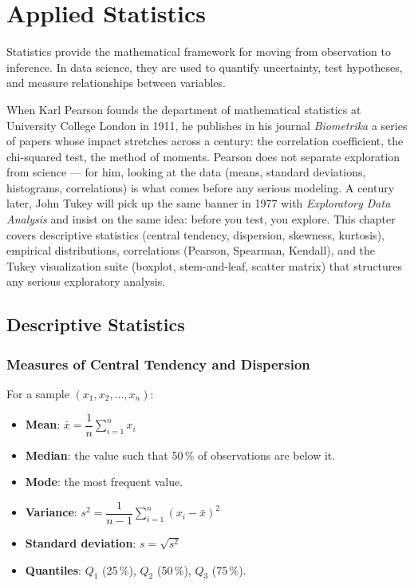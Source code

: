 \chapter{Applied Statistics}
\label{ch:statistiques}

\begin{intuition}
Statistics provide the mathematical framework for moving from observation to inference. In data science, they are used to quantify uncertainty, test hypotheses, and measure relationships between variables.
\end{intuition}

When Karl Pearson founds the department of mathematical statistics at University College London in 1911, he publishes in his journal \emph{Biometrika} a series of papers whose impact stretches across a century: the correlation coefficient, the chi-squared test, the method of moments. Pearson does not separate exploration from science --- for him, looking at the data (means, standard deviations, histograms, correlations) is what comes before any serious modeling. A century later, John Tukey will pick up the same banner in 1977 with \emph{Exploratory Data Analysis} and insist on the same idea: before you test, you explore. This chapter covers descriptive statistics (central tendency, dispersion, skewness, kurtosis), empirical distributions, correlations (Pearson, Spearman, Kendall), and the Tukey visualization suite (boxplot, stem-and-leaf, scatter matrix) that structures any serious exploratory analysis.

\section{Descriptive Statistics}

\subsection{Measures of Central Tendency and Dispersion}

\begin{definition}
For a sample $(x_1, x_2, \ldots, x_n)$:
\begin{itemize}
    \item \textbf{Mean}: $\bar{x} = \dfrac{1}{n}\displaystyle\sum_{i=1}^{n} x_i$
    \item \textbf{Median}: the value such that 50\,\% of observations are below it.
    \item \textbf{Mode}: the most frequent value.
    \item \textbf{Variance}: $s^2 = \dfrac{1}{n-1}\displaystyle\sum_{i=1}^{n}(x_i - \bar{x})^2$
    \item \textbf{Standard deviation}: $s = \sqrt{s^2}$
    \item \textbf{Quantiles}: $Q_1$ (25\,\%), $Q_2$ (50\,\%), $Q_3$ (75\,\%).
\end{itemize}
\end{definition}

